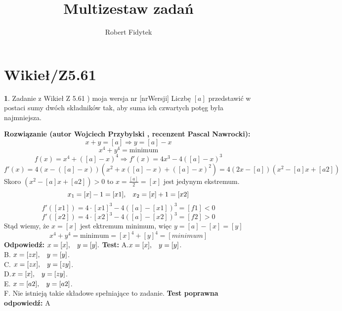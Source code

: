 \documentclass[12pt, a4paper]{article}
\title{Multizestaw zadań}
\author{Robert Fidytek}
\date{}
\theoremstyle{definition} %
\newtheorem{zad}{}
\newcommand{\kategoria}[1]{\section{#1}} %
\newcommand{\zadStart}[1]{\begin{zad}#1\newline} %
\newcommand{\zadStop}{\end{zad}}   %
\newcommand{\rozwStart}[2]{\noindent \textbf{Rozwiązanie (autor #1 , recenzent #2): }\newline} %
\newcommand{\rozwStop}{\newline}                                            %
\newcommand{\odpStart}{\noindent \textbf{Odpowiedź:}\newline}    %
\newcommand{\odpStop}{\newline}                                             %
\newcommand{\testStart}{\noindent \textbf{Test:}\newline} %
\newcommand{\testStop}{\newline} %
\newcommand{\kluczStart}{\noindent \textbf{Test poprawna odpowiedź:}\newline} %
\newcommand{\kluczStop}{\newline} %
\begin{document}
\maketitle


\kategoria{Wikieł/Z5.61}
\zadStart{Zadanie z Wikieł Z 5.61 ) moja wersja nr [nrWersji]}
Liczbę $[a]$ przedstawić w postaci sumy dwóch składników tak, aby suma ich czwartych potęg była najmniejsza.
\zadStop
\rozwStart{Wojciech Przybylski}{Pascal Nawrocki}
$$x+y=[a] \Rightarrow y=[a]-x$$
$$x^{4}+y^{4}=\mbox{minimum}$$
$$f(x)=x^{4}+([a]-x)^{4} \Rightarrow f'(x)=4x^{3}-4([a]-x)^{3}$$
$$f'(x)=4(x-([a]-x))(x^{2}+x([a]-x)+([a]-x)^{2})=4(2x-[a])(x^{2}-[a]x+[a2])$$
Skoro $(x^{2}-[a]x+[a2])>0$ to $x=\frac{[a]}{2}=[x]$ jest jedynym ekstremum.
$$x_{1}=[x]-1=[x1], \hspace{3mm} x_{2}=[x]+1=[x2]$$
$$f'([x1])=4\cdot[x1]^{3}-4([a]-[x1])^{3}=[f1]<0$$
$$f'([x2])=4\cdot[x2]^{3}-4([a]-[x2])^{3}=[f2]>0$$
Stąd wiemy, że $x=[x]$ jest ektremum minimum, więc $y=[a]-[x]=[y]$
$$x^{4}+y^{4}=\mbox{minimum}=[x]^{4}+[y]^{4}=[minimum]$$
\rozwStop
\odpStart
$x=[x], \hspace{3mm} y=[y].$
\odpStop
\testStart
A.$x=[x], \hspace{3mm} y=[y]$.\\
B. $x=[zx], \hspace{3mm} y=[y]$.\\
C. $x=[zx], \hspace{3mm} y=[zy]$.\\
D.$x=[x], \hspace{3mm} y=[zy]$.\\
E. $x=[a2], \hspace{3mm} y=[a2]$.\\
F. Nie istnieją takie składowe spełniające to zadanie.
\testStop
\kluczStart
A
\kluczStop
\end{document}
